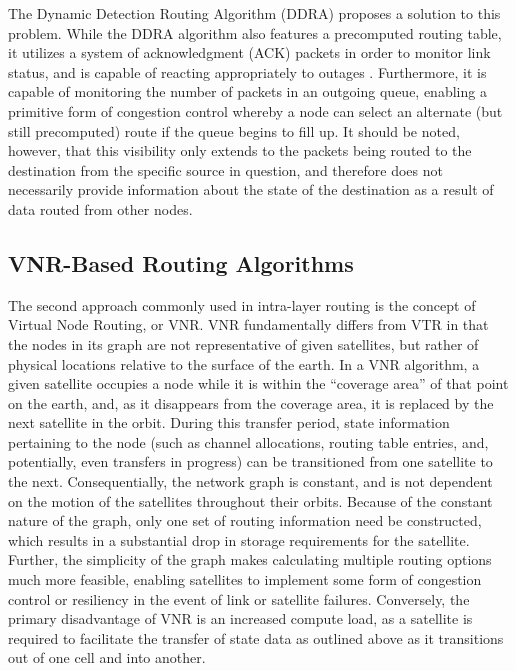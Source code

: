 The Dynamic Detection Routing Algorithm (DDRA) proposes a solution to this problem. While the DDRA algorithm also features a precomputed routing table, it utilizes a system of acknowledgment (ACK) packets in order to monitor link status, and is capable of reacting appropriately to outages \cite{tan_novel_2014}. Furthermore, it is capable of monitoring the number of packets in an outgoing queue, enabling a primitive form of congestion control whereby a node can select an alternate (but still precomputed) route if the queue begins to fill up. It should be noted, however, that this visibility only extends to the packets being routed to the destination from the specific source in question, and therefore does not necessarily provide information about the state of the destination as a result of data routed from other nodes. 

\subsection{VNR-Based Routing Algorithms}\label{subsec:vnr}
The second approach commonly used in intra-layer routing is the concept of Virtual Node Routing, or VNR. VNR fundamentally differs from VTR in that the nodes in its graph are not representative of given satellites, but rather of physical locations relative to the surface of the earth. In a VNR algorithm, a given satellite occupies a node while it is within the ``coverage area'' of that point on the earth, and, as it disappears from the coverage area, it is replaced by the next satellite in the orbit. During this transfer period, state information pertaining to the node (such as channel allocations, routing table entries, and, potentially, even transfers in progress) can be transitioned from one satellite to the next. Consequentially, the network graph is constant, and is not dependent on the motion of the satellites throughout their orbits. Because of the constant nature of the graph, only one set of routing information need be constructed, which results in a substantial drop in storage requirements for the satellite. Further, the simplicity of the graph makes calculating multiple routing options much more feasible, enabling satellites to implement some form of congestion control or resiliency in the event of link or satellite failures. Conversely, the primary disadvantage of VNR is an increased compute load, as a satellite is required to facilitate the transfer of state data as outlined above as it transitions out of one cell and into another.

